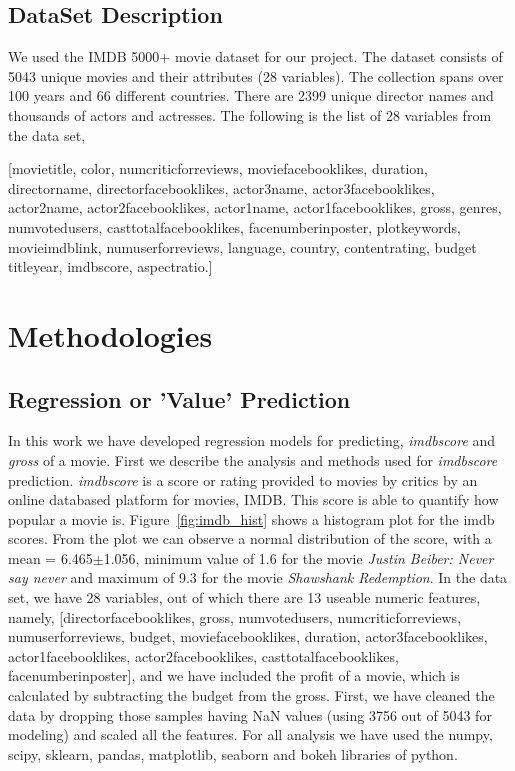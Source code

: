 \documentclass{article}%
\begin{document}
\subsection{DataSet Description}

We used the IMDB 5000+ movie dataset for our project. The dataset consists of 5043 unique movies and their attributes (28 variables). The collection spans over 100 years and 66 different countries. There are 2399 unique director names and thousands of actors and actresses. The following is the list of 28 variables from the data set,

[movietitle, color, numcriticforreviews, moviefacebooklikes, duration, directorname, directorfacebooklikes, actor3name, actor3facebooklikes, actor2name, actor2facebooklikes, actor1name, actor1facebooklikes, gross, genres, numvotedusers, casttotalfacebooklikes, facenumberinposter, plotkeywords, movieimdblink, numuserforreviews, language, country, contentrating, budget titleyear, imdbscore, aspectratio.]

\section{Methodologies}
\subsection{Regression or 'Value' Prediction}
In this work we have developed regression models for predicting, \textit{imdbscore} and \textit{gross} of a movie. First we describe the analysis and methods used for \textit{imdbscore} prediction. \textit{imdbscore} is a score or rating provided to movies by critics by an online databased platform for movies, IMDB\cite{}. This score is able to quantify how popular a movie is. Figure~\ref{fig:imdb_hist} shows a histogram plot for the imdb scores. From the plot we can observe a normal distribution of the score, with a mean = 6.465$\pm$1.056, minimum value of 1.6 for the movie \textit{Justin Beiber: Never say never} and maximum of 9.3 for the movie \textit{Shawshank Redemption}. 
In the data set, we have 28 variables, out of which there are 13 useable numeric features, namely, [directorfacebooklikes, gross, numvotedusers, numcriticforreviews, numuserforreviews, budget, moviefacebooklikes, duration, actor3facebooklikes, actor1facebooklikes, actor2facebooklikes, casttotalfacebooklikes, facenumberinposter], and we have included the profit of a movie, which is calculated by subtracting the budget from the gross. First, we have cleaned the data by dropping those samples having NaN values (using 3756 out of 5043 for modeling) and scaled all the features. For all analysis we have used the numpy, scipy, sklearn, pandas, matplotlib, seaborn and bokeh libraries of python.
\end{document}

